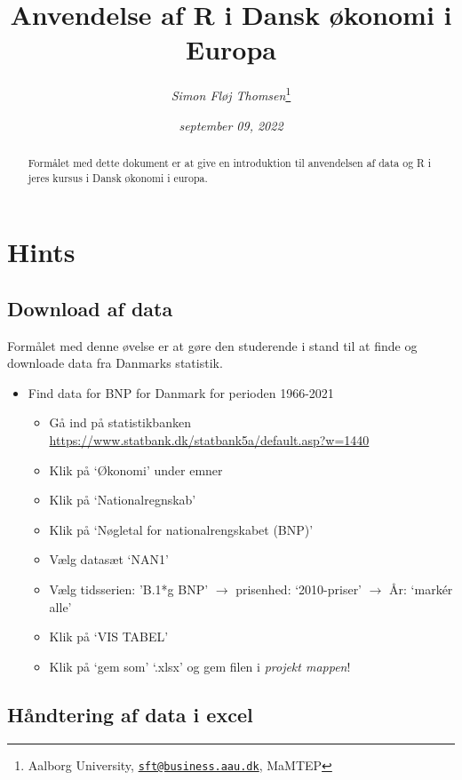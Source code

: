 \documentclass[
  12pt,
]{article}
\title{Anvendelse af R i Dansk økonomi i Europa}
\author{\emph{Simon Fløj Thomsen}\footnote{Aalborg University,
  \href{mailto:sft@business.aau.dk}{\nolinkurl{sft@business.aau.dk}},
  MaMTEP}}
\date{\emph{september 09, 2022}}
\providecommand{\tightlist}{%
  \setlength{\itemsep}{0pt}\setlength{\parskip}{0pt}}
\begin{document}
\maketitle
\begin{abstract}
\begingroup Formålet med dette dokument er at give en introduktion til
anvendelsen af data og R i jeres kursus i Dansk økonomi i europa.
\endgroup
\end{abstract}

\newpage

\hypertarget{hints}{%
\section{Hints}\label{hints}}

\hypertarget{download-af-data}{%
\subsection{Download af data}\label{download-af-data}}

Formålet med denne øvelse er at gøre den studerende i stand til at finde
og downloade data fra Danmarks statistik.

\begin{itemize}
\tightlist
\item
  Find data for BNP for Danmark for perioden 1966-2021

  \begin{itemize}
  \tightlist
  \item
    Gå ind på statistikbanken
    \url{https://www.statbank.dk/statbank5a/default.asp?w=1440}
  \item
    Klik på `Økonomi' under emner
  \item
    Klik på `Nationalregnskab'
  \item
    Klik på `Nøgletal for nationalrengskabet (BNP)'
  \item
    Vælg datasæt `NAN1'
  \item
    Vælg tidsserien: 'B.1*g BNP' \(\rightarrow\) prisenhed:
    `2010-priser' \(\rightarrow\) År: `markér alle'
  \item
    Klik på `VIS TABEL'
  \item
    Klik på `gem som' `.xlsx' og gem filen i \emph{projekt mappen}!
  \end{itemize}
\end{itemize}

\hypertarget{huxe5ndtering-af-data-i-excel}{%
\subsection{Håndtering af data i
excel}\label{huxe5ndtering-af-data-i-excel}}
\end{document}
